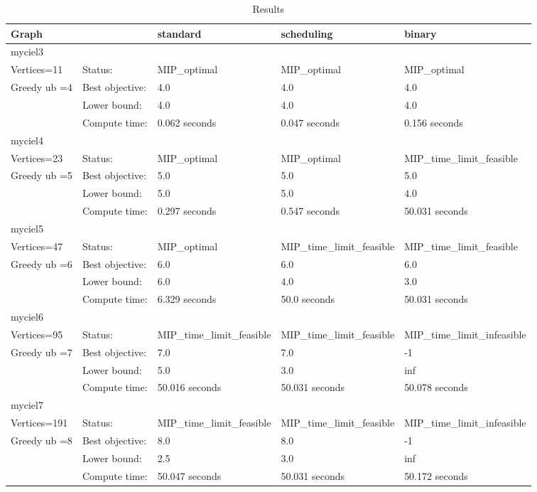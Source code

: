 \begin{table}[]
\centering
\caption{Results}
\label{table}
\begin{tabular}{l||l|l|l|l}
Graph & &standard &scheduling  &binary\\
\toprule
myciel3&&&&\\
Vertices=11 &Status: &MIP\_optimal  &MIP\_optimal &MIP\_optimal\\
\cline{2-5}
Greedy ub =4&Best objective: &4.0  &4.0 &4.0\\
\cline{2-5}
&Lower bound: &4.0  &4.0 &4.0\\
\cline{2-5}
&Compute time: &0.062 seconds  &0.047 seconds &0.156 seconds\\
\hline
myciel4&&&&\\
Vertices=23 &Status: &MIP\_optimal  &MIP\_optimal &MIP\_time\_limit\_feasible\\
\cline{2-5}
Greedy ub =5&Best objective: &5.0  &5.0 &5.0\\
\cline{2-5}
&Lower bound: &5.0  &5.0 &4.0\\
\cline{2-5}
&Compute time: &0.297 seconds  &0.547 seconds &50.031 seconds\\
\hline
myciel5&&&&\\
Vertices=47 &Status: &MIP\_optimal  &MIP\_time\_limit\_feasible &MIP\_time\_limit\_feasible\\
\cline{2-5}
Greedy ub =6&Best objective: &6.0  &6.0 &6.0\\
\cline{2-5}
&Lower bound: &6.0  &4.0 &3.0\\
\cline{2-5}
&Compute time: &6.329 seconds  &50.0 seconds &50.031 seconds\\
\hline
myciel6&&&&\\
Vertices=95 &Status: &MIP\_time\_limit\_feasible  &MIP\_time\_limit\_feasible &MIP\_time\_limit\_infeasible\\
\cline{2-5}
Greedy ub =7&Best objective: &7.0  &7.0 &-1\\
\cline{2-5}
&Lower bound: &5.0  &3.0 &inf\\
\cline{2-5}
&Compute time: &50.016 seconds  &50.031 seconds &50.078 seconds\\
\hline
myciel7&&&&\\
Vertices=191 &Status: &MIP\_time\_limit\_feasible  &MIP\_time\_limit\_feasible &MIP\_time\_limit\_infeasible\\
\cline{2-5}
Greedy ub =8&Best objective: &8.0  &8.0 &-1\\
\cline{2-5}
&Lower bound: &2.5  &3.0 &inf\\
\cline{2-5}
&Compute time: &50.047 seconds  &50.031 seconds &50.172 seconds\\
\hline
\bottomrule
\end{tabular}
\end{table}